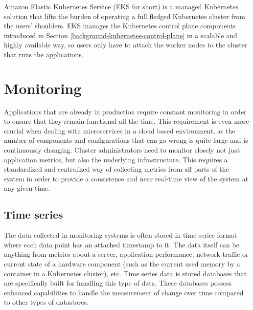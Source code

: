 Amazon Elastic Kubernetes Service (EKS for short) is a managed Kubernetes solution that lifts the burden of operating a full fledged Kubernetes cluster from the users' shoulders. EKS manages the Kubernetes control plane components introduced in Section \ref{background-kubernetes-control-plane} in a scalable and highly available way, so users only have to attach the worker nodes to the cluster that runs the applications. \cite{AWSEKS}

\section{Monitoring}

Applications that are already in production require constant monitoring in order to ensure that they remain functional all the time. This requirement is even more crucial when dealing with microservices in a cloud based environment, as the number of components and configurations that can go wrong is quite large and is continuously changing. Cluster administrators need to monitor closely not just application metrics, but also the underlying infrastructure. This requires a standardized and centralized way of collecting metrics from all parts of the system in order to provide a consistence and near real-time view of the system at any given time.

\subsection{Time series}

The data collected in monitoring systems is often stored in time series format where each data point has an attached timestamp to it. The data itself can be anything from metrics about a server, application performance, network traffic or current state of a hardware component (such as the current used memory by a container in a Kubernetes cluster), etc. Time series data is stored databases that are specifically built for handling this type of data. These databases possess enhanced capabilities to handle the measurement of change over time compared to other types of datastores. \cite{TimeSeriesInflux}

